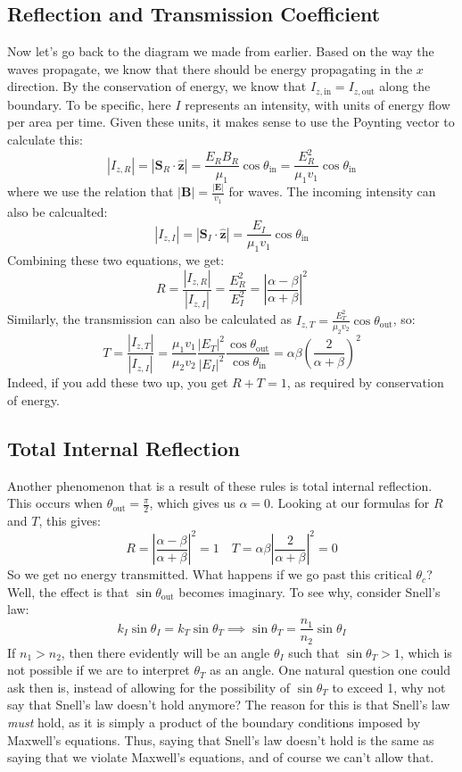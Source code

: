 \subsection{Reflection and Transmission Coefficient}
Now let's go back to the diagram we made from earlier. Based on the way the waves propagate, we know that
there should be energy propagating in the \( x \) direction. By the conservation of energy, we know that \(
I_{z, \text{in}} = I_{z, \text{out}} \) along the boundary. To be specific, here \( I \) represents an
intensity, with units of energy flow per area per time. Given these units, it makes sense to use the Poynting
vector to calculate this:
\[
	|I_{z, R}| = |\mathbf{S}_R \cdot \mathbf{\hat{z}}| = \frac{E_R B_R}{\mu_1}\cos \theta_\text{in} =
	\frac{E_R^2}{\mu_1v_1} \cos \theta_\text{in}
\]
where we use the relation that \( |\mathbf{B}| = \frac{|\mathbf{E}|}{v_1} \) for waves. The incoming
intensity can also be calcualted:
\[
	|I_{z, I}| = |\mathbf{S}_I \cdot \mathbf{\hat{z}}| = \frac{E_I}{\mu_1v_1} \cos \theta_\text{in}
\]
Combining these two equations, we get:
\[
	R = \frac{|I_{z, R}|}{|I_{z, I}|} = \frac{E_R^2}{E_I^2} = \left| \frac{\alpha - \beta}{\alpha + \beta}
	\right|^2
\]
Similarly, the transmission can also be calculated as \( I_{z, T} = \frac{E_T^2}{\mu_2v_2} \cos
\theta_\text{out} \), so:
\[
	T = \frac{|I_{z, T}|}{|I_{z, I}|} = \frac{\mu_1v_1}{\mu_2v_2} \frac{|E_T|^2}{|E_I|^2}
	\frac{\cos\theta_\text{out}}{\cos\theta_\text{in}} = \alpha \beta \left( \frac{2}{\alpha + \beta}
	\right)^2
\]
Indeed, if you add these two up, you get \( R + T = 1 \), as required by conservation of energy. 

\subsection{Total Internal Reflection}

Another phenomenon that is a result of these rules is total internal reflection. This occurs when \(
\theta_\text{out} = \frac{\pi}{2} \), which gives us \( \alpha = 0 \). Looking at our formulas for \( R \)
and \( T \), this gives:
\[
	R = \left| \frac{\alpha - \beta}{\alpha + \beta} \right|^2 = 1 \quad T = \alpha \beta \left|
	\frac{2}{\alpha + \beta} \right|^2 = 0
\]
So we get no energy transmitted. What happens if we go past this critical \( \theta_c \)? Well, the effect is
that \( \sin \theta_\text{out} \) becomes imaginary. To see why, consider Snell's law:
\[
	k_I \sin \theta_I = k_T \sin \theta_T \implies \sin \theta_T = \frac{n_1}{n_2} \sin \theta_I
\]
If \( n_1 > n_2 \), then there evidently will be an angle \( \theta_I \) such that \( \sin \theta_T > 1 \),
which is not possible if we are to interpret \( \theta_T \) as an angle. One natural question one could ask
then is, instead of allowing for the possibility of \( \sin \theta_T \) to exceed 1, why not say that Snell's
law doesn't hold anymore? The reason for this is that Snell's law \textit{must} hold, as it is simply a
product of the boundary conditions imposed by Maxwell's equations. Thus, saying that Snell's law doesn't hold
is the same as saying that we violate Maxwell's equations, and of course we can't allow that. 


